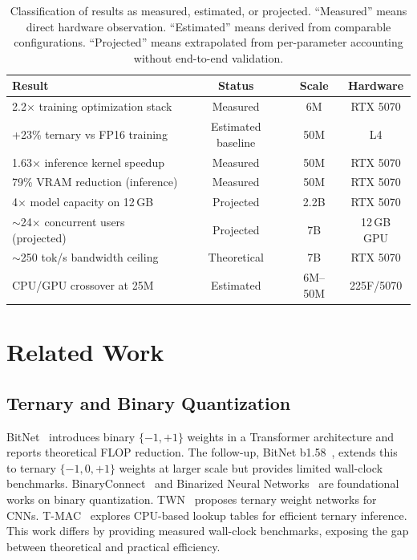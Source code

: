 \documentclass{article}
\begin{document}
\begin{table}[t]
\centering
\small
\caption{Classification of results as measured, estimated, or projected. ``Measured'' means direct hardware observation. ``Estimated'' means derived from comparable configurations. ``Projected'' means extrapolated from per-parameter accounting without end-to-end validation.}
\label{tab:measured_vs_projected}
\begin{tabular}{lccc}
\toprule
\textbf{Result} & \textbf{Status} & \textbf{Scale} & \textbf{Hardware} \\
\midrule
2.2$\times$ training optimization stack & Measured & 6M & RTX 5070 \\
+23\% ternary vs FP16 training & Estimated baseline & 50M & L4 \\
1.63$\times$ inference kernel speedup & Measured & 50M & RTX 5070 \\
79\% VRAM reduction (inference) & Measured & 50M & RTX 5070 \\
4$\times$ model capacity on 12\,GB & Projected & 2.2B & RTX 5070 \\
$\sim$24$\times$ concurrent users (projected) & Projected & 7B & 12\,GB GPU \\
$\sim$250 tok/s bandwidth ceiling & Theoretical & 7B & RTX 5070 \\
CPU/GPU crossover at 25M & Estimated & 6M--50M & 225F/5070 \\
\bottomrule
\end{tabular}
\end{table}

\section{Related Work}

\subsection{Ternary and Binary Quantization}

BitNet~\citep{wang2023bitnet} introduces binary $\{-1, +1\}$ weights in a Transformer architecture and reports theoretical FLOP reduction. The follow-up, BitNet b1.58~\citep{ma2024era}, extends this to ternary $\{-1, 0, +1\}$ weights at larger scale but provides limited wall-clock benchmarks. BinaryConnect~\citep{courbariaux2015binaryconnect} and Binarized Neural Networks~\citep{hubara2016binarized} are foundational works on binary quantization. TWN~\citep{li2016ternary} proposes ternary weight networks for CNNs. T-MAC~\citep{wei2024tmac} explores CPU-based lookup tables for efficient ternary inference. This work differs by providing measured wall-clock benchmarks, exposing the gap between theoretical and practical efficiency.
\end{document}
